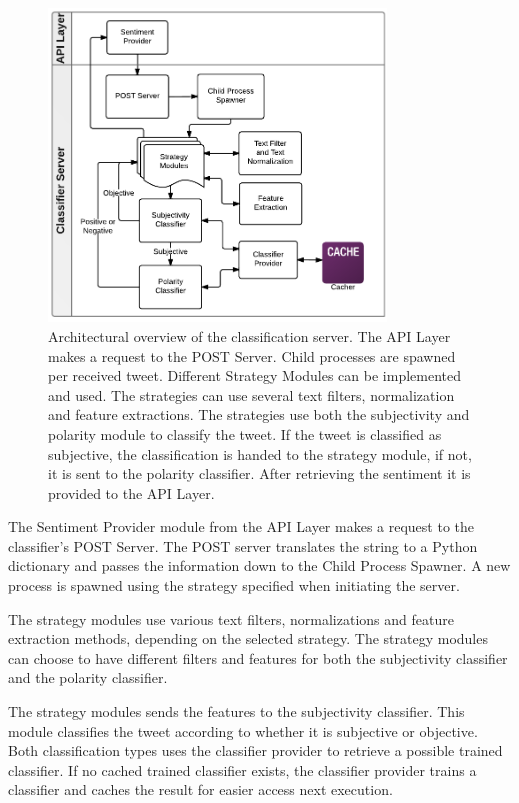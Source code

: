 \begin{figure}[htb]
 \begin{center}
     \includegraphics[width=0.8\textwidth]{./figs/ClassifierArcitechture.pdf}
 \end{center}
 \caption[Architectural overview of the classification server.]{Architectural overview of the classification server. The API Layer makes a request to the POST Server. Child processes are spawned per received tweet. Different Strategy Modules can be implemented and used. The strategies can use several text filters, normalization and feature extractions. The strategies use both the subjectivity and polarity module to classify the tweet. If the tweet is classified as subjective, the classification is handed to the strategy module, if not, it is sent to the polarity classifier. After retrieving the sentiment it is provided to the API Layer.}
 \label{fig:ClassifierArcitechture}
\end{figure}

The Sentiment Provider module from the API Layer makes a request to the classifier's POST Server. The POST server translates the string to a Python dictionary and passes the information down to the Child Process Spawner. A new process is spawned using the strategy specified when initiating the server. 

The strategy modules use various text filters, normalizations and feature extraction methods, depending on the selected strategy. The strategy modules can choose to have different filters and features for both the subjectivity classifier and the polarity classifier. 

The strategy modules sends the features to the subjectivity classifier. This module classifies the tweet according to whether it is subjective or objective. Both classification types uses the classifier provider to retrieve a possible trained classifier. If no cached trained classifier exists, the classifier provider trains a classifier and caches the result for easier access next execution. 

